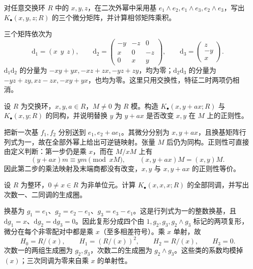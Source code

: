 \begin{exercise}\label{b3:ex:15-three-matrices}
	对任意交换环 \(R\) 中的 \(x,y,z\)，在二次外幂中采用基 \(e_1\wedge e_2,e_1\wedge e_3,e_2\wedge e_3\)，写出 \(K_\bullet(x,y,z;R)\) 的三个微分矩阵，并计算相邻矩阵乘积。
\end{exercise}
\begin{solution}
	三个矩阵依次为
	\[
		\mathrm{d}_1=(x\ \ y\ \ z),\qquad
		\mathrm{d}_2=\begin{pmatrix}-y&-z&0\\x&0&-z\\0&x&y\end{pmatrix},
		\qquad \mathrm{d}_3=\begin{pmatrix}z\\-y\\x\end{pmatrix}.
	\]
	\(\mathrm{d}_1\mathrm{d}_2\) 的分量为 \(-xy+yx,-xz+zx,-yz+zy\)，均为零；\(\mathrm{d}_2\mathrm{d}_3\) 的分量为 \(-yz+zy,xz-zx,-xy+yx\)，也均为零。这里只用交换性，特征二时两项仍相消。
\end{solution}

\begin{exercise}\label{b3:ex:15-generator-operation}
	设 \(R\) 为交换环，\(x,y,a\in R\)，\(M\ne0\) 为 \(R\) 模。构造 \(K_\bullet(x,y+ax;R)\) 与 \(K_\bullet(x,y;R)\) 的同构，并说明替换 \(y\) 为 \(y+ax\) 是否改变 \(x,y\) 在 \(M\) 上的正则性。
\end{exercise}
\begin{solution}
	把新一次基 \(f_1,f_2\) 分别送到 \(e_1,e_2+ae_1\)。其微分分别为 \(x,y+ax\)，且换基矩阵行列式为一，故在全部外幂上给出可逆链映射。张量 \(M\) 后仍为同构。正则性可直接由定义判断：第一步仍是乘 \(x\)，而在 \(M/xM\) 上有
	\[
		(y+ax)m\equiv ym\pmod{xM}, \qquad (x,y+ax)M=(x,y)M.
	\]
	因此第二步的乘法映射及末端商都没有改变，\(x,y\) 与 \(x,y+ax\) 的正则性等价。
\end{solution}

\begin{exercise}\label{b3:ex:15-repeated-equation}
	设 \(R\) 为整环，\(0\ne x\in R\) 为非单位元。计算 \(K_\bullet(x,x,x;R)\) 的全部同调，并写出次数一、二同调的生成圈。
\end{exercise}
\begin{solution}
	换基为 \(g_1=e_1\)、\(g_2=e_2-e_1\)、\(g_3=e_3-e_1\)。这是行列式为一的整数换基，且 \(\mathrm{d}g_1=x\)、\(\mathrm{d}g_2=\mathrm{d}g_3=0\)。因此复形分成四个由 \(1,g_2,g_3,g_2\wedge g_3\) 标记的两项复形，微分在每个非零配对中都是乘 \(x\)（至多相差符号）。乘 \(x\) 单射，故
	\[
		H_0=R/(x),\qquad H_1=(R/(x))^2,\qquad H_2=R/(x),\qquad H_3=0.
	\]
	次数一的两组生成圈为 \(g_2,g_3\)，次数二的生成圈为 \(g_2\wedge g_3\)。这些类的系数均模掉 \((x)\)；三次同调为零来自乘 \(x\) 的单射性。
\end{solution}

